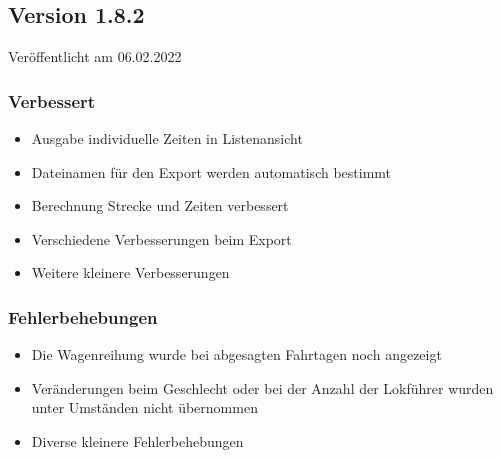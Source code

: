 \subsection{Version 1.8.2}
\label{version:1:8:2}
Veröffentlicht am 06.02.2022
\subsubsection{Verbessert}
\begin{itemize}
  \item
  Ausgabe individuelle Zeiten in Listenansicht
  \item
  Dateinamen für den Export werden automatisch bestimmt
  \item
  Berechnung Strecke und Zeiten verbessert
  \item
  Verschiedene Verbesserungen beim Export
  \item
  Weitere kleinere Verbesserungen
\end{itemize}

\subsubsection{Fehlerbehebungen}
\begin{itemize}
  \item
  Die Wagenreihung wurde bei abgesagten Fahrtagen noch angezeigt
  \item
  Veränderungen beim Geschlecht oder bei der Anzahl der Lokführer wurden unter Umständen nicht übernommen
  \item
  Diverse kleinere Fehlerbehebungen
\end{itemize}


